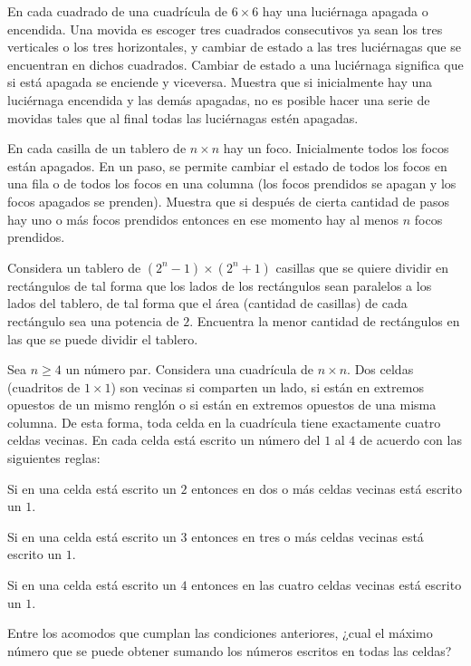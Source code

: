 \documentclass[11pt]{scrartcl}
\begin{document}
\begin{problem}
    [2007/5] 
    En cada cuadrado de una cuadrícula de $6 \times 6$ hay una luciérnaga apagada o encendida.
Una movida es escoger tres cuadrados consecutivos ya sean los tres verticales o los tres
horizontales, y cambiar de estado a las tres luciérnagas que se encuentran en dichos
cuadrados. Cambiar de estado a una luciérnaga significa que si está apagada se enciende
y viceversa.
Muestra que si inicialmente hay una luciérnaga encendida y las demás apagadas, no es
posible hacer una serie de movidas tales que al final todas las luciérnagas estén apagadas.
\end{problem}
\begin{problem}
    [2010/2]
    En cada casilla de un tablero de $n \times n$ hay un foco. Inicialmente todos los focos están
apagados. En un paso, se permite cambiar el estado de todos los focos en una fila o de
todos los focos en una columna (los focos prendidos se apagan y los focos apagados se
prenden).
Muestra que si después de cierta cantidad de pasos hay uno o más focos prendidos entonces
en ese momento hay al menos $n$ focos prendidos.
\end{problem}
\begin{problem}
    [2011/5] 
    Considera un tablero de $(2^n - 1) \times (2^n + 1)$ casillas que se quiere dividir en rectángulos
de tal forma que los lados de los rectángulos sean paralelos a los lados del tablero, de
tal forma que el área (cantidad de casillas) de cada rectángulo sea una potencia de $2$.
Encuentra la menor cantidad de rectángulos en las que se puede dividir el tablero.
\end{problem}
\begin{problem}
    [2012/2]
    Sea $n \geq 4$ un número par. Considera una cuadrícula de $n \times n$. Dos celdas (cuadritos
de $1 \times 1$) son vecinas si comparten un lado, si están en extremos opuestos de un mismo
renglón o si están en extremos opuestos de una misma columna. De esta forma, toda celda
en la cuadrícula tiene exactamente cuatro celdas vecinas.
En cada celda está escrito un número del $1$ al $4$ de acuerdo con las siguientes reglas:

Si en una celda está escrito un $2$ entonces en dos o más celdas vecinas está escrito
un $1$.

Si en una celda está escrito un $3$ entonces en tres o más celdas vecinas está escrito
un $1$.

Si en una celda está escrito un $4$ entonces en las cuatro celdas vecinas está escrito
un $1$.

Entre los acomodos que cumplan las condiciones anteriores, ¿cual el máximo número que
se puede obtener sumando los números escritos en todas las celdas?
\end{problem}
\end{document}
